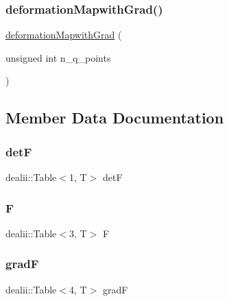 \subsubsection{\texorpdfstring{deformationMapwithGrad()}{deformationMapwithGrad()}}
{\footnotesize\ttfamily \mbox{\hyperlink{structdeformation_mapwith_grad}{deformation\+Mapwith\+Grad}} (\begin{DoxyParamCaption}\item[{unsigned int}]{n\+\_\+q\+\_\+points }\end{DoxyParamCaption})\hspace{0.3cm}{\ttfamily [inline]}}



\subsection{Member Data Documentation}
\mbox{\label{structdeformation_mapwith_grad_aa1ff2dc8fb6f4f6e9125ca026505a977}} 
\subsubsection{\texorpdfstring{detF}{detF}}
{\footnotesize\ttfamily dealii\+::\+Table$<$1, T$>$ detF}

\mbox{\label{structdeformation_mapwith_grad_a7934bed7ba72b5e4a3af1fd8a4e14198}} 
\subsubsection{\texorpdfstring{F}{F}}
{\footnotesize\ttfamily dealii\+::\+Table$<$3, T$>$ F}

\mbox{\label{structdeformation_mapwith_grad_a5bd7f05522c7d581d02e4de55682f5f2}} 
\subsubsection{\texorpdfstring{gradF}{gradF}}
{\footnotesize\ttfamily dealii\+::\+Table$<$4, T$>$ gradF}

